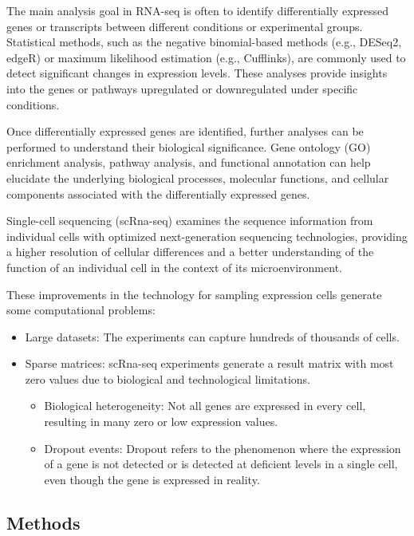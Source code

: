 \documentclass[aps,prb,twocolumn,superscriptaddress,floatfix,longbibliography]{revtex4-2}
\newif\ifptitle
\newif\ifpnumber
\newcounter{para}
\newcommand\ptitle[1]{\par\refstepcounter{para}
{\ifpnumber{\noindent\textcolor{lightgray}{\textbf{\thepara}}\indent}\fi}
{\ifptitle{\textbf{[{#1}]}}\fi}}
\begin{document}
The main analysis goal in RNA-seq is often to identify differentially expressed genes or transcripts between different conditions or experimental groups. Statistical methods, such as the negative binomial-based methods (e.g., DESeq2, edgeR) or maximum likelihood estimation (e.g., Cufflinks), are commonly used to detect significant changes in expression levels. These analyses provide insights into the genes or pathways upregulated or downregulated under specific conditions.

Once differentially expressed genes are identified, further analyses can be performed to understand their biological significance. Gene ontology (GO) enrichment analysis, pathway analysis, and functional annotation can help elucidate the underlying biological processes, molecular functions, and cellular components associated with the differentially expressed genes.


\vspace{2mm}

\ptitle{Single-cell sequencing} \cite{triumphs-and-limitations-scrna} Single-cell sequencing (scRna-seq) examines the sequence information from individual cells with optimized next-generation sequencing technologies, providing a higher resolution of cellular differences and a better understanding of the function of an individual cell in the context of its microenvironment.

These improvements in the technology for sampling expression cells generate some computational problems:
\begin{itemize}
 \item Large datasets: The experiments can capture hundreds of thousands of cells.
 \item Sparse matrices: scRna-seq experiments generate a result matrix with most zero values due to biological and technological limitations.
 \begin{itemize}
    \item Biological heterogeneity: Not all genes are expressed in every cell, resulting in many zero or low expression values.
    \item Dropout events: Dropout refers to the phenomenon where the expression of a gene is not detected or is detected at deficient levels in a single cell, even though the gene is expressed in reality.
 \end{itemize}

\end{itemize}

\subsection{Methods}
\end{document}
